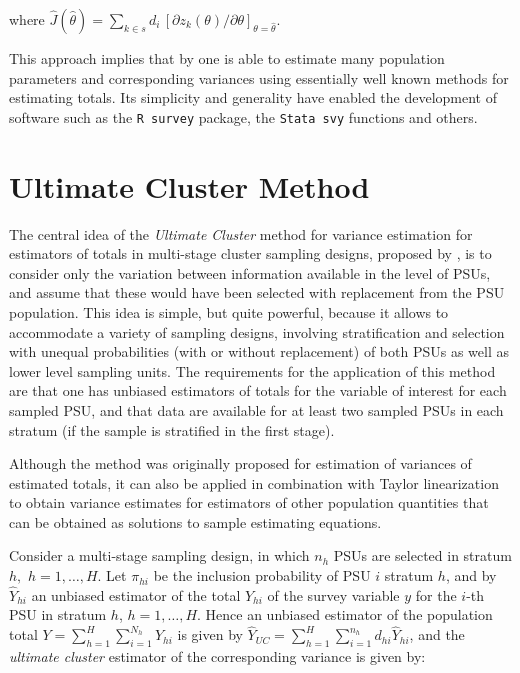 \documentclass[
  12pt,
]{book}
\begin{document}
where \(\widehat J (\widehat \theta) = \sum _{k \in s} d_i \, \left[ \partial{z_k ( \theta)} / \partial \theta \right]_{\theta = \widehat \theta}\).

This approach implies that by one is able to estimate many population parameters and corresponding variances using essentially well known methods for estimating totals. Its simplicity and generality have enabled the development of software such as the \texttt{R\ survey} package, the \texttt{Stata\ svy} functions and others.

\section{Ultimate Cluster Method}\label{ultimate-cluster-method}

The central idea of the \emph{Ultimate Cluster} method for variance estimation for estimators of totals in multi-stage cluster sampling designs, proposed by \citep{Hansen1953}, is to consider only the variation between information available in the level of PSUs, and assume that these would have been selected with replacement from the PSU population. This idea is simple, but quite powerful, because it allows to accommodate a variety of sampling designs, involving stratification and selection with unequal probabilities (with or without replacement) of both PSUs as well as lower level sampling units. The requirements for the application of this method are that one has unbiased estimators of totals for the variable of interest for each sampled PSU, and that data are available for at least two sampled PSUs in each stratum (if the sample is stratified in the first stage).

Although the method was originally proposed for estimation of variances of estimated totals, it can also be applied in combination with Taylor linearization to obtain variance estimates for estimators of other population quantities that can be obtained as solutions to sample estimating equations.

Consider a multi-stage sampling design, in which \(n_{h}\) PSUs are selected in stratum \(h,\) \(h=1,\ldots ,H\). Let \(\pi_{hi}\) be the inclusion probability of PSU \(i\) stratum \(h\), and by \(\widehat{Y}_{hi}\) an unbiased estimator of the total \(Y_{hi}\) of the survey variable \(y\) for the \(i\)-th PSU in stratum \(h\), \(h=1,\ldots ,H\). Hence an unbiased estimator of the population total \(Y = \sum_{h=1}^{H} \sum_{i=1}^{N_{h}} Y_{hi}\) is given by \(\widehat{Y}_{UC} = \sum_{h=1}^{H} \sum_{i=1}^{n_{h}} d_{hi} \widehat{Y}_{hi}\), and the \emph{ultimate cluster} estimator of the corresponding variance is given by:
\end{document}
